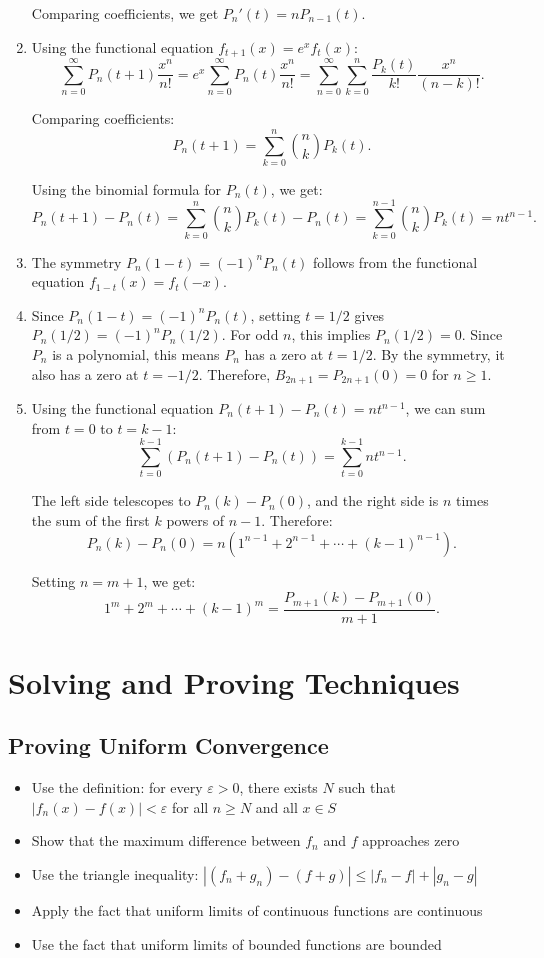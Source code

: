\begin{enumerate}[label=(\alph*)]
Comparing coefficients, we get \( P_n'(t) = nP_{n-1}(t) \).

\item Using the functional equation \( f_{t+1}(x) = e^x f_t(x) \):
\[\sum_{n=0}^\infty P_n(t+1) \frac{x^n}{n!} = e^x \sum_{n=0}^\infty P_n(t) \frac{x^n}{n!} = \sum_{n=0}^\infty \sum_{k=0}^n \frac{P_k(t)}{k!} \frac{x^n}{(n-k)!}.\]

Comparing coefficients:
\[P_n(t+1) = \sum_{k=0}^n \binom{n}{k} P_k(t).\]

Using the binomial formula for \( P_n(t) \), we get:
\[P_n(t+1) - P_n(t) = \sum_{k=0}^n \binom{n}{k} P_k(t) - P_n(t) = \sum_{k=0}^{n-1} \binom{n}{k} P_k(t) = nt^{n-1}.\]

\item The symmetry \( P_n(1-t) = (-1)^n P_n(t) \) follows from the functional equation \( f_{1-t}(x) = f_t(-x) \).

\item Since \( P_n(1-t) = (-1)^n P_n(t) \), setting \( t = 1/2 \) gives \( P_n(1/2) = (-1)^n P_n(1/2) \). For odd \( n \), this implies \( P_n(1/2) = 0 \). Since \( P_n \) is a polynomial, this means \( P_n \) has a zero at \( t = 1/2 \). By the symmetry, it also has a zero at \( t = -1/2 \). Therefore, \( B_{2n+1} = P_{2n+1}(0) = 0 \) for \( n \geq 1 \).

\item Using the functional equation \( P_n(t+1) - P_n(t) = nt^{n-1} \), we can sum from \( t = 0 \) to \( t = k-1 \):
\[\sum_{t=0}^{k-1} (P_n(t+1) - P_n(t)) = \sum_{t=0}^{k-1} nt^{n-1}.\]

The left side telescopes to \( P_n(k) - P_n(0) \), and the right side is \( n \) times the sum of the first \( k \) powers of \( n-1 \). Therefore:
\[P_n(k) - P_n(0) = n(1^{n-1} + 2^{n-1} + \cdots + (k-1)^{n-1}).\]

Setting \( n = m+1 \), we get:
\[1^m + 2^m + \cdots + (k-1)^m = \frac{P_{m+1}(k) - P_{m+1}(0)}{m+1}.\]
\end{enumerate}

\section{Solving and Proving Techniques}

\subsection*{Proving Uniform Convergence}
\begin{itemize}
\item Use the definition: for every $\varepsilon > 0$, there exists $N$ such that $|f_n(x) - f(x)| < \varepsilon$ for all $n \geq N$ and all $x \in S$
\item Show that the maximum difference between $f_n$ and $f$ approaches zero
\item Use the triangle inequality: $|(f_n + g_n) - (f + g)| \leq |f_n - f| + |g_n - g|$
\item Apply the fact that uniform limits of continuous functions are continuous
\item Use the fact that uniform limits of bounded functions are bounded
\end{itemize}

